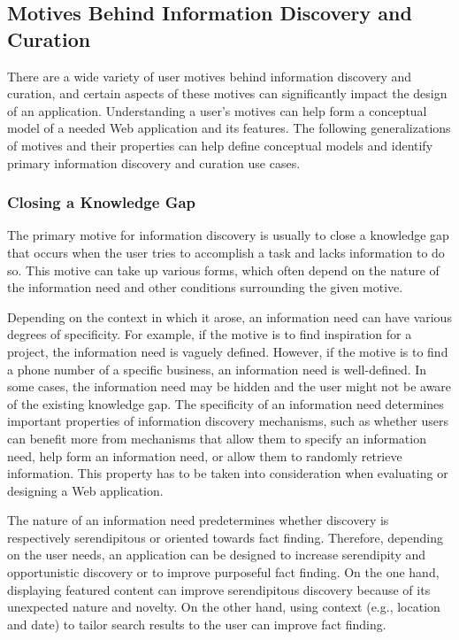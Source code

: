 \documentclass{sigchi}
\begin{document}
{\subsection{Motives Behind Information Discovery and Curation}


There are a wide variety of user motives behind information discovery and curation, and certain aspects of these motives can significantly impact the design of an application. Understanding a user's motives can help form a conceptual model of a needed Web application and its features. The following generalizations of motives and their properties can help define conceptual models and identify primary information discovery and curation use cases.  

{\subsubsection{Closing a Knowledge Gap}
The primary motive for information discovery is usually to close a knowledge gap that occurs when the user tries to accomplish a task and lacks information to do so. This motive can take up various forms, which often depend on the nature of the information need and other conditions surrounding the given motive.        

Depending on the context in which it arose, an information need can have various degrees of specificity. For example, if the motive is to find inspiration for a project, the information need is vaguely defined. However, if the motive is to find a phone number of a specific business, an information need is well-defined. In some cases, the information need may be hidden and the user might not be aware of the existing knowledge gap. The specificity of an information need determines important properties of information discovery mechanisms, such as whether users can benefit more from mechanisms that allow them to specify an information need, help form an information need, or allow them to randomly retrieve information. This property has to be taken into consideration when evaluating or designing a Web application. 

The nature of an information need predetermines whether discovery is respectively serendipitous or oriented towards fact finding. Therefore, depending on the user needs, an application can be designed to increase serendipity and opportunistic discovery or to improve purposeful fact finding. On the one hand, displaying featured content can improve serendipitous discovery because of its unexpected nature and novelty. On the other hand, using context (e.g., location and date) to tailor search results to the user can improve fact finding. 

}}
\end{document}
